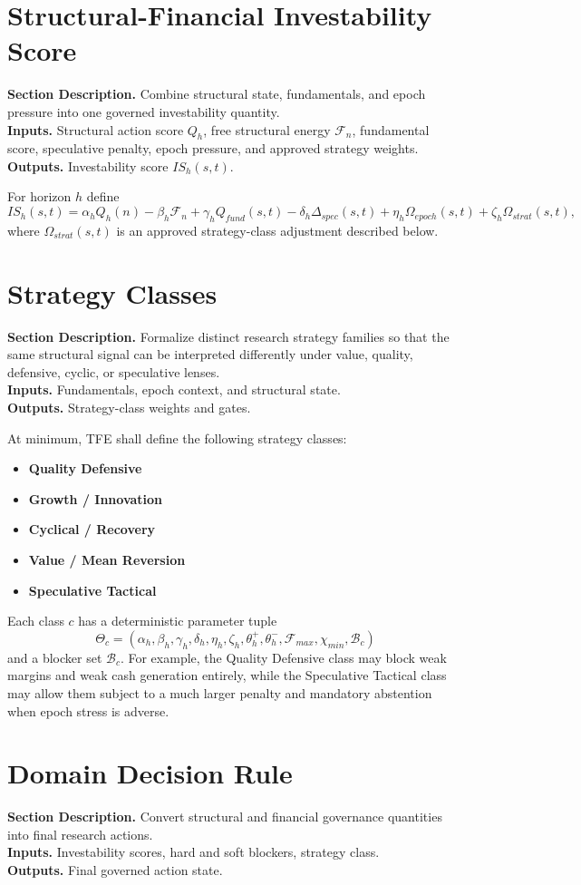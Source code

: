 \documentclass[11pt]{report}
\newcommand{\meta}[3]{\textbf{Section Description.} #1\\
\textbf{Inputs.} #2\\
\textbf{Outputs.} #3\par}
\begin{document}
\section{Structural-Financial Investability Score}
\meta{Combine structural state, fundamentals, and epoch pressure into one governed investability quantity.}{Structural action score $Q_h$, free structural energy $\mathcal{F}_n$, fundamental score, speculative penalty, epoch pressure, and approved strategy weights.}{Investability score $IS_h(s,t)$.}

For horizon $h$ define
\[
IS_h(s,t)=
\alpha_h Q_h(n)
-\beta_h \mathcal{F}_n
+\gamma_h Q_{fund}(s,t)
-\delta_h \Delta_{spec}(s,t)
+\eta_h \Omega_{epoch}(s,t)
+\zeta_h \Omega_{strat}(s,t),
\]
where $\Omega_{strat}(s,t)$ is an approved strategy-class adjustment described below.

\section{Strategy Classes}
\meta{Formalize distinct research strategy families so that the same structural signal can be interpreted differently under value, quality, defensive, cyclic, or speculative lenses.}{Fundamentals, epoch context, and structural state.}{Strategy-class weights and gates.}

At minimum, TFE shall define the following strategy classes:
\begin{itemize}
\item \textbf{Quality Defensive}
\item \textbf{Growth / Innovation}
\item \textbf{Cyclical / Recovery}
\item \textbf{Value / Mean Reversion}
\item \textbf{Speculative Tactical}
\end{itemize}

Each class $c$ has a deterministic parameter tuple
\[
\Theta_c=(\alpha_h,\beta_h,\gamma_h,\delta_h,\eta_h,\zeta_h,\theta_h^+,\theta_h^-,\mathcal{F}_{max},\chi_{min},\mathcal{B}_c)
\]
and a blocker set $\mathcal{B}_c$. For example, the Quality Defensive class may block weak margins and weak cash generation entirely, while the Speculative Tactical class may allow them subject to a much larger penalty and mandatory abstention when epoch stress is adverse.

\section{Domain Decision Rule}
\meta{Convert structural and financial governance quantities into final research actions.}{Investability scores, hard and soft blockers, strategy class.}{Final governed action state.}
\end{document}
